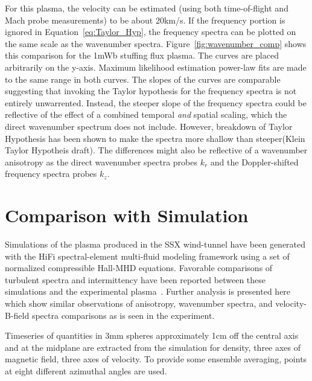 \documentclass[aip,prl,amsmath,amssymb,reprint,superscriptaddress]{revtex4-1} %
\begin{document}
For this plasma, the velocity can be estimated (using both time-of-flight and Mach probe measurements) to be about 20km/s. If the frequency portion is ignored in Equation~\ref{eq:Taylor_Hyp}, the frequency spectra can be plotted on the same scale as the wavenumber spectra. Figure~\ref{fig:wavenumber_comp} shows this comparison for the 1mWb stuffing flux plasma. The curves are placed arbitrarily on the y-axis. Maximum likelihood estimation power-law fits are made to the same range in both curves. The slopes of the curves are comparable suggesting that invoking the Taylor hypothesis for the frequency spectra is not entirely unwarrented. Instead, the steeper slope of the frequency spectra could be reflective of the effect of a combined temporal {\it and} spatial scaling, which the direct wavenumber spectrum does not include. However, breakdown of Taylor Hypothesis has been shown to make the spectra more shallow than steeper(Klein Taylor Hypotheis draft). The differences might also be reflective of a wavenumber anisotropy as the direct wavenumber spectra probes $k_{r}$ and the Doppler-shifted frequency spectra probes $k_{z}$.

\section{Comparison with Simulation}

Simulations of the plasma produced in the SSX wind-tunnel have been generated with the HiFi spectral-element multi-fluid modeling framework using a set of normalized compressible Hall-MHD equations. Favorable comparisons of turbulent spectra and intermittency have been reported between these simulations and the experimental plasma~\cite{schaffner14a}. Further analysis is presented here which show similar observations of anisotropy, wavenumber spectra, and velocity-B-field spectra comparisons as is seen in the experiment.

Timeseries of quantities in 3mm spheres approximately 1cm off the central axis and at the midplane are extracted from the simulation for density, three axes of magnetic field, three axes of velocity. To provide some ensemble averaging, points at eight different azimuthal angles are used.
\end{document}
